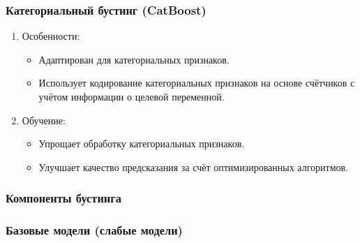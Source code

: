 \begin{enumerate}
\hypertarget{ux43aux430ux442ux435ux433ux43eux440ux438ux430ux43bux44cux43dux44bux439-ux431ux443ux441ux442ux438ux43dux433-catboost}{%
\subsubsection*{Категориальный бустинг
(CatBoost)}\label{ux43aux430ux442ux435ux433ux43eux440ux438ux430ux43bux44cux43dux44bux439-ux431ux443ux441ux442ux438ux43dux433-catboost}}

\begin{enumerate}
\def\labelenumi{\arabic{enumi}.}
\tightlist
\item
  Особенности:

  \begin{itemize}
  \tightlist
  \item
    Адаптирован для категориальных признаков.
  \item
    Использует кодирование категориальных признаков на основе счётчиков
    с учётом информации о целевой переменной.
  \end{itemize}
\item
  Обучение:

  \begin{itemize}
  \tightlist
  \item
    Упрощает обработку категориальных признаков.
  \item
    Улучшает качество предсказания за счёт оптимизированных алгоритмов.
  \end{itemize}
\end{enumerate}

\hypertarget{ux43aux43eux43cux43fux43eux43dux435ux43dux442ux44b-ux431ux443ux441ux442ux438ux43dux433ux430}{%
\subsubsection*{Компоненты
бустинга}\label{ux43aux43eux43cux43fux43eux43dux435ux43dux442ux44b-ux431ux443ux441ux442ux438ux43dux433ux430}}

\hypertarget{ux431ux430ux437ux43eux432ux44bux435-ux43cux43eux434ux435ux43bux438-ux441ux43bux430ux431ux44bux435-ux43cux43eux434ux435ux43bux438}{%
\subsubsection*{Базовые модели (слабые
модели)}\label{ux431ux430ux437ux43eux432ux44bux435-ux43cux43eux434ux435ux43bux438-ux441ux43bux430ux431ux44bux435-ux43cux43eux434ux435ux43bux438}}


\end{enumerate}
